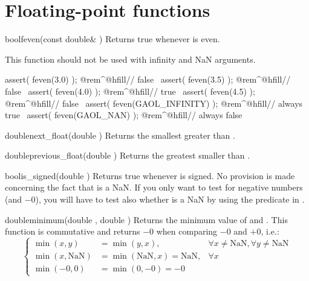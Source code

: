 \documentclass{manual}
\begin{document}
\section{Floating-point functions}

\begin{deffun}{bool}{feven}{(const double\& )}
  Returns true whenever  is even.

  This function should not be used with infinity and NaN arguments.

  \begin{example}
    assert( feven(3.0) ); @rem^@hfill// false~
    assert( feven(3.5) ); @rem^@hfill// false~
    assert( feven(4.0) ); @rem^@hfill// true~
    assert( feven(4.5) ); @rem^@hfill// false~
    assert( feven(GAOL_INFINITY) ); @rem^@hfill// always true~
    assert( feven(GAOL_NAN) ); @rem^@hfill// always false~
  \end{example}
\end{deffun}

\begin{deffun}{double}{next\_float}{(double )}
  Returns the smallest  greater than .
\end{deffun}

\begin{deffun}{double}{previous\_float}{(double )}
  Returns the greatest  smaller than .
\end{deffun}

\begin{deffun}{bool}{is\_signed}{(double )}
Returns true whenever  is signed. No provision is made concerning the
fact that  is a NaN. If you only want to test for negative
numbers (and $-0$), you will have to test also whether  is a NaN
by using the  predicate in .
\end{deffun}

\begin{deffun}{double}{minimum}{(double , double )}
  Returns the minimum  value of 
  and . This function is commutative and returns $-0$ when comparing
  $-0$ and $+0$, i.e.:
\begin{equation*}
\left\{\begin{array}{lll}
    \min(x,y) &=\min(y,x), &\forall x\neq\text{NaN}, \forall y\neq\text{NaN}\\
    \min(x,\text{NaN}) &=\min(\text{NaN},x)=\text{NaN}, &\forall x\\
    \min(-0,0) &=\min(0,-0)=-0
  \end{array}\right.
\end{equation*}
\end{deffun}
\end{document}
